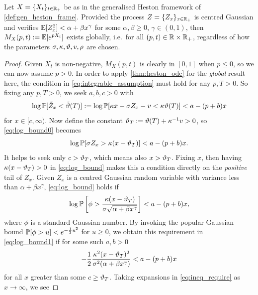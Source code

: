 \begin{theorem}\label{cor:gauss_heston_mgf}
    Let $X=\{X_t\}_{t\in\mathbb{R}_+}$ be as in the generalised Heston framework of \autoref{def:gen_heston_frame}. Provided the process $Z=\{Z_x\}_{x\in\mathbb{R}_+}$ is centred Gaussian and verifies $\mathbb{E}[Z_x^2] < \alpha + \beta x^{\gamma}$ for some $\alpha,\beta \ge 0$, $\gamma\in(0,1)$, then $M_X(p,t):=\mathbb{E}[e^{p X_t}]$ exists globally, i.e.~for all $(p,t)\in\mathbb{R}\times\mathbb{R}_+$, regardless of how the parameters $\sigma,\kappa,\vartheta,v,\rho$ are chosen.
\end{theorem}
\begin{proof}
    Given $X_t$ is non-negative, $M_X(p,t)$ is clearly in $[0,1]$ when $p\le0$, so we can now assume $p>0$. In order to apply \autoref{thm:heston_ode} for the \emph{global} result here, the condition in \autoref{eq:integrable_assumption} must hold for any $p,T>0$. So fixing any $p,T>0$, we seek $a,b,c>0$ with
    \begin{equation}\label{eq:log_bound0}
        \log\mathbb{P}[\tilde{Z}_x < \tilde{\vartheta}(T)] := \log\mathbb{P}[\kappa x - \sigma Z_x - v < \kappa\vartheta(T)] < a-(p+b) x
    \end{equation}
    for $x\in[c,\infty)$. Now define the constant $\vartheta_T:=\vartheta(T)+\kappa^{-1}v>0$, so \autoref{eq:log_bound0} becomes
    \begin{equation}\label{eq:log_bound}
        \log\mathbb{P}[\sigma Z_x > \kappa(x-\vartheta_T)] < a-(p+b) x.
    \end{equation}
    It helps to seek only $c>\vartheta_T$, which means also $x>\vartheta_T$. Fixing $x$, then having $\kappa(x-\vartheta_T)>0$ in \autoref{eq:log_bound} makes this a condition directly on the \emph{positive} tail of $Z_x$. Given $Z_x$ is a centred Gaussian random variable with variance less than $\alpha + \beta x^{\gamma}$, \autoref{eq:log_bound} holds if
    \begin{equation}\label{eq:log_bound1}
        \log\mathbb{P}\left[\phi > \frac{\kappa(x - \vartheta_T)}{\sigma\sqrt{\alpha + \beta x^{\gamma}}}\right] < a-(p+b) x,
    \end{equation}
    where $\phi$ is a standard Gaussian number. By invoking the popular Gaussian bound $\mathbb{P}[\phi>u]<e^{-\frac12 u^2}$ for $u\ge0$, we obtain this requirement in \autoref{eq:log_bound1} if for some such $a,b>0$
    \begin{equation}\label{eq:ineq_require}
        -\frac12\frac{\kappa^2(x - \vartheta_T)^2}{\sigma^2(\alpha + \beta x^{\gamma})} < a - (p+b) x
    \end{equation}
    for all $x$ greater than some $c\ge\vartheta_T$. Taking expansions in \autoref{eq:ineq_require} as $x\to\infty$, we see

\end{proof}
